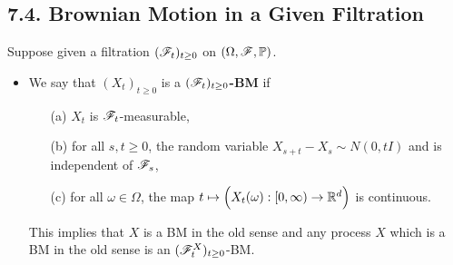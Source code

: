 \documentclass[12pt,a4paper]{report}
\begin{document}
\subsection*{7.4. Brownian Motion in a Given Filtration}

Suppose given a filtration $(\mathscr{F}_t)_{t\geq 0}$ on $(\Omega, \mathscr{F}, \mathbb{P})$.
\begin{itemize}
\item We say that $(X_t)_{t\geq 0}$ is a \textbf{$(\mathscr{F}_t)_{t\geq 0}$-BM} if
\begin{itemize}
\item[(a)] $X_t$ is $\mathscr{F}_t$-measurable,
\item[(b)] for all $s,t \geq 0$, the random variable $X_{s+t} - X_s \sim N(0, tI)$ and is independent of $\mathscr{F}_s$,
\item[(c)] for all $\omega \in \Omega$, the map $t\mapsto \Big( X_t(\omega) : [0,\infty ) \rightarrow \mathbb{R}^d \Big)$ is continuous.
\end{itemize}
This implies that $X$ is a BM in the old sense and any process $X$ which is a BM in the old sense is an $(\mathscr{F}_t^X)_{t\geq 0}$-BM.
\end{itemize}
\end{document}
